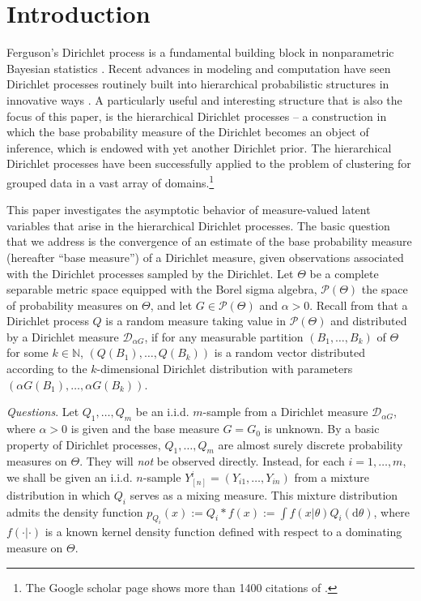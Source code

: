 \documentclass[MSNbibl,number,citesort]{arxbj}
\def\comment{}
\newcommand{\Nat}{\mathbb{N}}
\newcommand{\Pcal}{\mathscr{P}}
\newcommand{\DP}{\mathscr{D}}
\newcommand{\YYn}{Y_{[n]}}
\begin{document}
\section{Introduction}\label{sec1}

Ferguson's Dirichlet process is a fundamental building block in nonparametric
Bayesian statistics \cite{Ferguson,Blackwell-MacQueen,Sethuraman}.
Recent advances in modeling and computation have seen Dirichlet processes
routinely built into hierarchical probabilistic structures in
innovative ways \cite{Hjort-etal-10}.
A particularly useful and interesting structure that is also the
focus of this paper, is
the hierarchical Dirichlet processes \cite{Teh-etal-06,Teh-Jordan-10} --
a construction in which
the base probability measure of the Dirichlet becomes an object of
inference, which is endowed with yet another Dirichlet prior.
The hierarchical Dirichlet processes have been successfully applied to
the problem of clustering for grouped data in
a vast array of domains.\footnote{The Google scholar page shows
more than 1400 citations of \cite{Teh-etal-06}.}


This paper investigates the asymptotic behavior of measure-valued
latent variables that arise in the hierarchical Dirichlet processes.
The basic question that we address
is the convergence of an estimate of the base probability measure
(hereafter ``base measure'') of a Dirichlet measure, given observations
associated with the Dirichlet processes sampled by
the Dirichlet.
Let $\Theta$ be a complete separable metric space equipped with the Borel
sigma algebra, $\Pcal(\Theta)$ the space of probability measures on
$\Theta$, and
let $G \in\Pcal(\Theta)$ and $\alpha> 0$.
Recall from \cite{Ferguson}
that a Dirichlet process $Q$ is a random measure taking value in $\Pcal
(\Theta)$
and distributed by a Dirichlet measure
$\DP_{\alpha G}$, if for any measurable partition $(B_1,\ldots, B_k)$ of
$\Theta$ for some $k \in\Nat$, $(Q(B_1),\ldots,Q(B_k))$ is
a random vector
distributed according to the $k$-dimensional Dirichlet distribution
with parameters $(\alpha G(B_1),\ldots, \alpha G(B_k))$.

\textit{Questions}.
Let $Q_1,\ldots, Q_m$ be an i.i.d. $m$-sample from a
Dirichlet measure $\DP_{\alpha G}$, where $\alpha> 0$ is
given and the base measure $G=G_0$ is unknown.
By a basic property of Dirichlet processes, $Q_1,\ldots, Q_m$ are
almost surely discrete probability measures on $\Theta$.
They will \emph{not} be observed directly.
Instead, for each $i=1,\ldots,m$, we shall be given an i.i.d. $n$-sample
$\YYn^i = (Y_{i1},\ldots,Y_{in})$
from a mixture distribution in which $Q_i$ serves as a mixing
measure. This mixture distribution admits the density function
$p_{Q_i}(x):= Q_i*f(x) := \int f(x|\theta) Q_i(\mathrm{d}\theta)$,
where $f(\cdot|\cdot)$ is a known kernel density function defined with
respect to a
dominating measure on $\Theta$.
\end{document}
